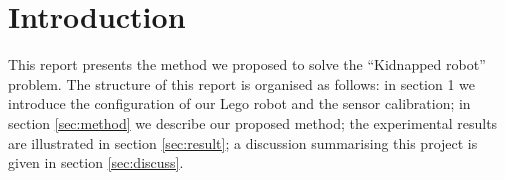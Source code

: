 \section*{Introduction}


This report presents the method we proposed to solve the ``Kidnapped robot'' problem. The structure of this report is organised as follows: in section 1 we introduce the configuration of our Lego robot and the sensor calibration; in section \ref{sec:method} we describe our proposed method; the experimental results are illustrated in section \ref{sec:result}; a discussion summarising this project is given in section \ref{sec:discuss}.

